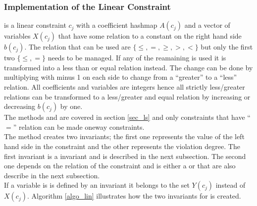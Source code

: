 \subsubsection{Implementation of the Linear Constraint}
 is a linear constraint $c_j$ with a coefficient hashmap $A(c_j)$ and a vector of variables $X(c_j)$ 
that have some relation to a constant on the right hand side $b(c_j)$. The relation that can be used are
$\{\leq,=,\geq,>,<\}$ 
but only the first two $\{\leq,=\}$ needs to be managed. If any of the reamaining is used it is transformed into a 
less than or equal relation instead. The change can be done by multiplying with minus 1 on each side to change from a
``greater'' to a ``less'' relation. All coefficients and variables are integers hence all strictly less/greater 
relations can be transformed to a less/greater and equal relation by increasing or decreasing $b(c_j)$ by one. \\
The methods  and  are covered in section \ref{sec_ls} and only 
 constraints that have ``$=$'' relation can be made oneway constraints. \\ 
The method  creates two invariants; the first one represents the value of the left hand side 
in 
the constraint and the other represents the violation degree. The first invariant is a  invariant and is 
described in the next subsection. The second one depends on the relation of the constraint and is either a 
 or 
 that are also describe in the next subsection. \\
If a variable is is defined by an invariant it belongs to the set $Y(c_j)$ instead of $X(c_j)$. Algorithm 
\ref{algo_lin} illustrates how the two invariants for  is created. \\
\IncMargin{1em}
